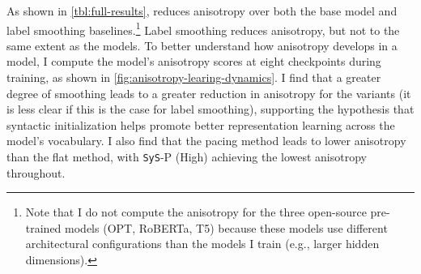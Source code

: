 As shown in \cref{tbl:full-results}, \newline \smoothing reduces anisotropy over both the base model and label smoothing baselines.\footnote{Note that I do not compute the anisotropy for the three open-source pre-trained models (OPT, RoBERTa, T5) because these models use different architectural configurations than the models I train (e.g., larger hidden dimensions).} Label smoothing reduces anisotropy, but not to the same extent as the \smoothing models. To better understand how anisotropy develops in a model, I compute the model's anisotropy scores at eight checkpoints during training, as shown in \cref{fig:anisotropy-learing-dynamics}. I find that a greater degree of smoothing leads to a greater reduction in anisotropy for the \smoothing variants (it is less clear if this is the case for label smoothing), supporting the hypothesis that syntactic initialization helps promote better representation learning across the model's vocabulary. I also find that the pacing method leads to lower anisotropy than the flat method, with \texttt{SyS}-P (High) achieving the lowest anisotropy throughout.

